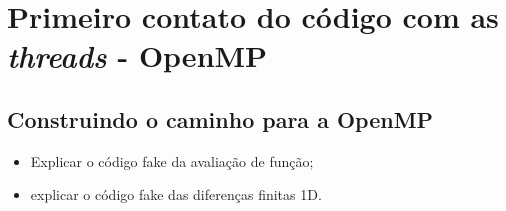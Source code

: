 \section{Primeiro contato do código com as \textit{threads} - OpenMP}

    \subsection{Construindo o caminho para a OpenMP}
    
	    \begin{itemize}
	    	\item Explicar o código fake da avaliação de função;
	    	\item explicar o código fake das diferenças finitas 1D.
	    \end{itemize}